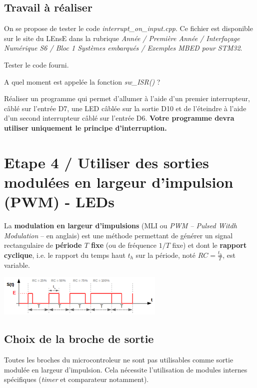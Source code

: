\documentclass[a4paper,11pt,titlepage]{article} %
\begin{document}
\subsection{Travail à réaliser}

On se propose de tester le code \textsl{interrupt\_on\_input.cpp}. Ce fichier est disponible sur le site du LEnsE dans la rubrique \textit{Année / Première Année / Interfaçage Numérique S6 / Bloc 1 Systèmes embarqués / Exemples MBED pour STM32}.

\Manip Tester le code fourni. 

\Quest A quel moment est appelée la fonction \textsl{sw\_ISR()} ?

\Manip Réaliser un programme qui permet d'allumer à l'aide d'un premier interrupteur, câblé sur l'entrée D7, une LED câblée sur la sortie D10 et de l'éteindre à l'aide d'un second interrupteur câblé sur l'entrée D6. \textbf{Votre programme devra utiliser uniquement le principe d'interruption.}


\newpage
\section{Etape 4 / Utiliser des sorties modulées en largeur d'impulsion (PWM) - LEDs}

La \textbf{modulation en largeur d'impulsions} (MLI ou \textit{PWM – Pulsed Witdh Modulation} – en anglais) est une méthode permettant de générer un signal rectangulaire de \textbf{période $T$ fixe} (ou de fréquence $1/T$ fixe) et dont le \textbf{rapport cyclique}, i.e. le rapport du temps haut $t_h$ sur la période, noté $RC = \frac{t_
h}{T}$, est variable.

\begin{center}
	\includegraphics[width=0.6\textwidth]{images/MINE_ElecNum_PWM_SignalPrincipe.png}
\end{center}

\subsection{Choix de la broche de sortie}

Toutes les broches du microcontroleur ne sont pas utilisables comme sortie modulée en largeur d'impulsion. Cela nécessite l'utilisation de modules internes spécifiques (\textit{timer} et comparateur notamment).
\end{document}
